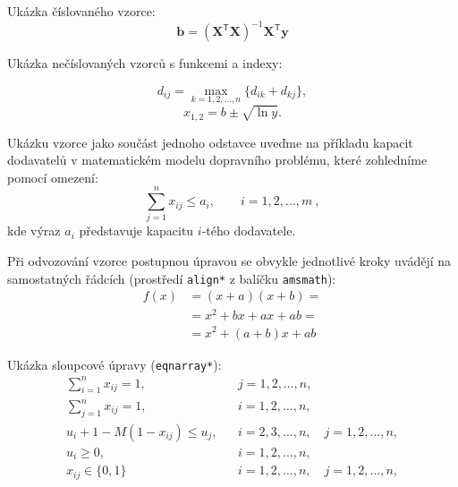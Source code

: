 Ukázka číslovaného vzorce:
\begin{equation}
\mathbf{b}=(\mathbf{X}^\mathsf{T}\mathbf{X})^{-1}\mathbf{X}^\mathsf{T}\mathbf{y}
\end{equation}

Ukázka nečíslovaných vzorců s funkcemi a indexy:

$$
d_{ij}=\max_{k=1,2,\dots,n} \{d_{ik}+d_{kj}\},
$$
$$
x_{1,2}=b \pm \sqrt{\ln y}.
$$

Ukázku vzorce jako součást jednoho odstavce uveďme na příkladu kapacit dodavatelů v matematickém modelu dopravního problému, které zohledníme pomocí omezení:
\begin{equation}
\sum_{j=1}^n x_{ij} \le a_i, \qquad i=1,2,\dots,m\ ,
\end{equation}
\noindent
kde výraz $a_i$ představuje kapacitu $i$-tého dodavatele.

Při odvozování vzorce postupnou úpravou se obvykle jednotlivé kroky uvádějí na samostatných řádcích (prostředí \verb'align*' z balíčku \verb|amsmath|):
\begin{align*}
 f(x) &= (x+a)(x+b) =\\
      &= x^2 + bx + ax + ab =\\
      &= x^2 + (a+b)x + ab
\end{align*}

Ukázka sloupcové úpravy (\verb|eqnarray*|):
\begin{eqnarray*}
\sum_{i=1}^n x_{ij} =1, && j=1,2,\dots,n,\\
\sum_{j=1}^n x_{ij} =1, && i=1,2,\dots,n,\\
u_i + 1 - M(1 - x_{ij}) \le u_j, && i=2,3,\dots,n,\quad j=1,2,\dots,n,\\
u_i \ge 0,              && i=1,2,\dots,n,\\
x_{ij} \in \{0,1\} && i=1,2,\dots,n,\quad j=1,2,\dots,n,\\
\end{eqnarray*}
